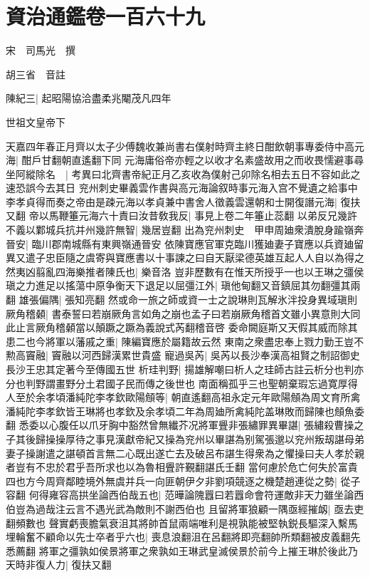 \section{資治通鑑卷一百六十九}
宋　司馬光　撰

胡三省　音註

陳紀三|{
	起昭陽協洽盡柔兆閹茂凡四年}


世祖文皇帝下

天嘉四年春正月齊以太子少傅魏收兼尚書右僕射時齊主終日酣飲朝事專委侍中高元海|{
	酣戶甘翻朝直遙翻下同}
元海庸俗帝亦輕之以收才名素盛故用之而收畏懦避事尋坐阿縱除名　|{
	考異曰北齊書帝紀正月乙亥收為僕射己卯除名相去五日不容如此之速恐誤今去其日}
兖州刺史畢義雲作書與高元海論叙時事元海入宫不覺遺之給事中李孝貞得而奏之帝由是疎元海以孝貞兼中書舍人徵義雲還朝和士開復譖元海|{
	復扶又翻}
帝以馬鞭箠元海六十責曰汝昔敎我反|{
	事見上卷二年箠止蕊翻}
以弟反兄幾許不義以鄴城兵抗并州幾許無智|{
	幾居豈翻}
出為兖州刺史　甲申周廸衆潰脫身踰嶺奔晉安|{
	臨川郡南城縣有東興嶺通晉安}
依陳寶應官軍克臨川獲廸妻子寶應以兵資廸留異又遣子忠臣隨之虞寄與寶應書以十事諫之曰自天厭梁德英雄互起人人自以為得之然夷凶翦亂四海樂推者陳氏也|{
	樂音洛}
豈非歷數有在惟天所授乎一也以王琳之彊侯瑱之力進足以搖蕩中原争衡天下退足以屈彊江外|{
	瑱他甸翻又音鎮屈其勿翻彊其兩翻}
雄張偏隅|{
	張知亮翻}
然或命一旅之師或資一士之說琳則瓦解氷泮投身異域瑱則厥角稽顙|{
	書泰誓曰若崩厥角言如角之崩也孟子曰若崩厥角稽首文雖小異意則大同此止言厥角稽顙當以顛蹶之蹶為義說式芮翻稽音啓}
委命闕庭斯又天假其威而除其患二也今將軍以藩戚之重|{
	陳編寶應於屬籍故云然}
東南之衆盡忠奉上戮力勤王豈不勲高竇融|{
	竇融以河西歸漢累世貴盛}
寵過吳芮|{
	吳芮以長沙奉漢高祖賢之制詔御史長沙王忠其定著今至傳國五世}
析珪判野|{
	揚雄解嘲曰析人之珪師古註云析分也判亦分也判野謂畫野分土君國子民而傳之後世也}
南面稱孤乎三也聖朝棄瑕忘過寛厚得人至於余孝頃潘純陀李孝欽歐陽頠等|{
	朝直遙翻高祖永定元年歐陽頠為周文育所禽潘純陀李孝欽皆王琳將也孝欽及余孝頃二年為周廸所禽純陀盖琳敗而歸陳也頠魚委翻}
悉委以心腹任以爪牙胸中豁然曾無纎芥况將軍舋非張繡罪異畢諶|{
	張繡殺曹操之子其後歸操操厚待之事見漢獻帝紀又操為兖州以畢諶為别駕張邈以兖州叛刼諶母弟妻子操謝遣之諶頓首言無二心既出遂亡去及破呂布諶生得衆為之懼操曰夫人孝於親者豈有不忠於君乎吾所求也以為魯相舋許覲翻諶氏壬翻}
當何慮於危亡何失於富貴四也方今周齊鄰睦境外無虞并兵一向匪朝伊夕非劉項競逐之機楚趙連從之勢|{
	從子容翻}
何得雍容高拱坐論西伯哉五也|{
	范曄論隗囂曰若囂命會符運敵非天力雖坐論西伯豈為過哉注云言不遇光武為敵則不謝西伯也}
且留將軍狼顧一隅亟經摧衂|{
	亟去吏翻頻數也}
聲實虧喪膽氣衰沮其將帥首鼠兩端唯利是視孰能被堅執鋭長驅深入繫馬埋輪奮不顧命以先士卒者乎六也|{
	喪息浪翻沮在呂翻將即亮翻帥所類翻被皮義翻先悉薦翻}
將軍之彊孰如侯景將軍之衆孰如王琳武皇滅侯景於前今上摧王琳於後此乃天時非復人力|{
	復扶又翻}
